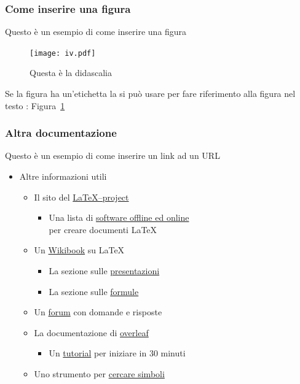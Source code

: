 \documentclass[10pt]{beamer}
\begin{document}
\begin{frame} \frametitle{Come inserire una figura}
Questo è un esempio di come inserire una figura
\begin{figure}
    \centering
    \texttt{[image: iv.pdf]}
    \caption{Questa è la didascalia}
    \label{fig:my_label}
\end{figure}
Se la figura ha un'etichetta la si può usare per fare riferimento
alla figura nel testo : Figura~\ref{fig:my_label}
\end{frame}

\begin{frame} \frametitle{Altra documentazione}
Questo è un esempio di come inserire un link ad un URL
\begin{itemize}
    \item Altre informazioni utili
    \begin{itemize}
        \item Il sito del \href{https://www.latex-project.org}{\LaTeX{}--project}
            \begin{itemize}
                \item Una lista di 
                \href{https://www.latex-project.org/get}{software offline ed online}\\
                per creare documenti \LaTeX{}
            \end{itemize}
        \item Un \href{https://en.wikibooks.org/wiki/LaTeX}{Wikibook} su \LaTeX
        \begin{itemize}
            \item La sezione sulle \href{https://en.wikibooks.org/wiki/LaTeX/Presentations}
            {presentazioni}
            \item La sezione sulle
            \href{https://en.wikibooks.org/wiki/LaTeX/Mathematics}{formule}
        \end{itemize}
        \item Un \href{https://tex.stackexchange.com/}{forum} con domande e risposte
        \item La documentazione di \href{https://it.overleaf.com/learn}{overleaf}
        \begin{itemize}
            \item Un \href{https://it.overleaf.com/learn/latex/Learn_LaTeX_in_30_minutes}
            {tutorial} per iniziare in 30 minuti
        \end{itemize}
        \item Uno strumento per \href{http://detexify.kirelabs.org/classify.html}
        {cercare simboli}
    \end{itemize}
\end{itemize}
\end{frame}
\end{document}
